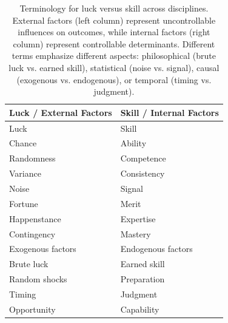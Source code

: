   \begin{table}[h]
    \centering
    \begin{tabular}{ll}
      \toprule
      \textbf{Luck / External Factors} & \textbf{Skill / Internal Factors} \\
      \midrule
      Luck & Skill \\
      Chance & Ability \\
      Randomness & Competence \\
      Variance & Consistency \\
      Noise & Signal \\
      Fortune & Merit \\
      Happenstance & Expertise \\
      Contingency & Mastery \\
      Exogenous factors & Endogenous factors \\
      Brute luck & Earned skill \\
      Random shocks & Preparation \\
      Timing & Judgment \\
      Opportunity & Capability \\
      \bottomrule
    \end{tabular}
    \caption{Terminology for luck versus skill across disciplines. External factors (left column) represent uncontrollable influences on outcomes, while internal factors (right column) represent controllable determinants. Different terms emphasize different aspects: philosophical (brute luck vs. earned skill), statistical (noise vs. signal), causal (exogenous vs. endogenous), or temporal (timing vs. judgment).}
    \label{tab:terminology}
  \end{table}

